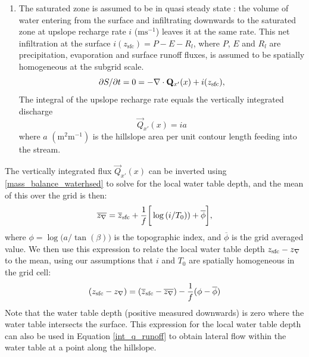 \documentclass[twoside,10pt]{report}
\begin{document}
\begin{enumerate}
\item The saturated zone is assumed to be in quasi steady state : the volume of water entering from the surface and infiltrating downwards to the saturated zone at upslope recharge rate $i$ ($\mathrm{ms^{-1}}$) leaves it at the same rate. This net infiltration at the surface $i(z_{\mathrm{sfc}})=P-E-R_{l}$, where $P$, $E$ and $R_{l}$ are precipitation, evaporation and  surface runoff fluxes, is assumed to be spatially homogeneous at the subgrid scale. 
    \begin{equation}
        \partial S/\partial t = 0 = -\nabla \cdot \mathbf{Q}_{x'}(x) + i(z_{\mathrm{sfc}}),
    \end{equation}
    The integral of the upslope recharge rate equals the vertically integrated discharge 
    \begin{equation}
        \vec{Q}_{x'}(x) = i a
        \label{mass_balance_waterhsed}
    \end{equation}
    where $a$ $(\mathrm{m^2m^{-1}})$ is the hillslope area per unit contour length feeding into the stream. 
    \end{enumerate} 

The vertically integrated flux $\vec{Q}_{x'}(x)$ can be inverted using \ref{mass_balance_waterhsed} to solve for the local water table depth, and the mean of this over the grid is then:
\begin{equation}
    \overline{z_\nabla} = \overline{z}_{\rm sfc}+ \frac{1}{f}\bigg[ \log{(i/T_0))} + \overline{\phi} \bigg],
\end{equation}
where $\phi = \log{(a/\tan{(\beta))}}$ is the topographic index, and $\overline{\phi}$ is the grid averaged value. We then use this expression to relate the local water table depth $z_{\rm sfc} - z_{\nabla}$  to the mean, using our assumptions that $i$ and $T_0$ are spatially homogeneous in the grid cell:
\begin{equation}\label{eq:wt_depth_ti}
    (z_{\rm sfc} - z_{\nabla}) = (\overline{z}_{\rm sfc}-\overline{z_{\nabla}})-\frac{1}{f}(\phi - \overline{\phi})
\end{equation}
Note that the water table depth (positive measured downwards) is zero where the water table intersects the surface. This expression for the local water table depth can also be used in Equation \eqref{int_q_runoff} to obtain lateral flow within the water table at a point along the hillslope. 
\end{document}
